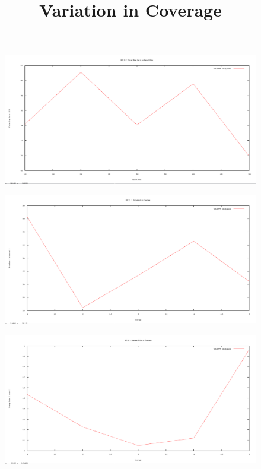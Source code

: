 \documentclass[12pt]{article}
\begin{document}
\begin{figure}[H]
	\centering
	\includegraphics[scale=	0.26]{image/802.15.4/Packetdropratio_vs_packetRates.png}
\end{figure}

\newpage
\title{Variation in Coverage}
\begin{figure}[H]
	\centering
	\includegraphics[scale=	0.26]{image/802.15.4/Throughput_vs_coverage.png}
\end{figure}

\begin{figure}[H]
	\centering
	\includegraphics[scale=	0.26]{image/802.15.4/Averagedelay_vs_coverage.png}
\end{figure}
\end{document}
